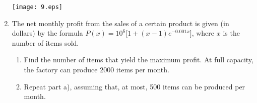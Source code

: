 \documentclass{article}
\begin{document}
\begin{enumerate}
\texttt{[image: 9.eps]}
\vspace{6cm}
\item The net monthly profit from the sales of a certain product is given
(in dollars) by the formula $P(x)=10^6\big[1+(x-1)e^{-0.001x}\big]$, where
$x$ is the number of items sold.
\begin{enumerate}
\item Find the number of items that yield the maximum profit.
At full capacity, the factory can produce 2000 items per month.
\vspace{4.5cm}
\item Repeat part a), assuming that, at most, 500 items can be
produced per month.
\end{enumerate}
\end{enumerate}
\end{document}
